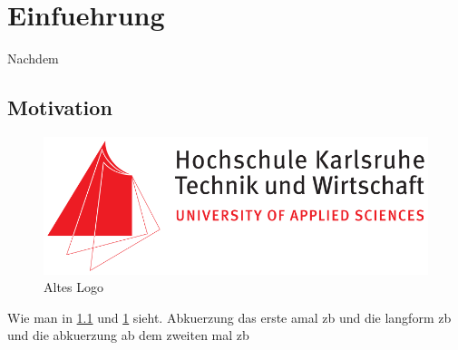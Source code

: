 \chapter{Einfuehrung}
\label{CH:1}
Nachdem
\section{Motivation}

\begin{figure}[t]
            \centering
		\includegraphics[width=1\textwidth]{images/logo/HsKa_old.jpg}
		\caption[Hka]{Altes Logo\cite{einstein}}
		\label{fig:structure}
\end{figure}
Wie man in \ref{fig:structure} und \ref{CH:1} sieht.
Abkuerzung das erste amal \ac{zb} und die langform \acl{zb} und die abkuerzung ab dem zweiten mal \ac{zb}
